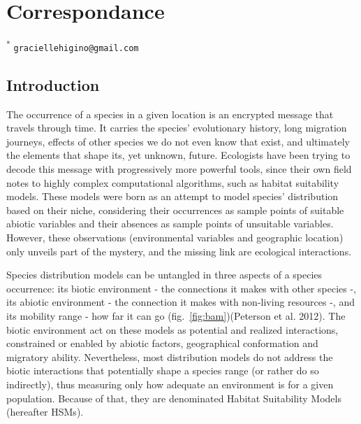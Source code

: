 \documentclass[12pt]{article}
\begin{document}
\section{Correspondance}

\textsuperscript{*}\,\,\texttt{graciellehigino@gmail.com}

\clearpage
\linenumbers
\doublespacing

\hypertarget{introduction}{%
\subsection{Introduction}\label{introduction}}

The occurrence of a species in a given location is an encrypted message
that travels through time. It carries the species' evolutionary history,
long migration journeys, effects of other species we do not even know
that exist, and ultimately the elements that shape its, yet unknown,
future. Ecologists have been trying to decode this message with
progressively more powerful tools, since their own field notes to highly
complex computational algorithms, such as habitat suitability models.
These models were born as an attempt to model species' distribution
based on their niche, considering their occurrences as sample points of
suitable abiotic variables and their absences as sample points of
unsuitable variables. However, these observations (environmental
variables and geographic location) only unveils part of the mystery, and
the missing link are ecological interactions.

Species distribution models can be untangled in three aspects of a
species occurrence: its biotic environment - the connections it makes
with other species -, its abiotic environment - the connection it makes
with non-living resources -, and its mobility range - how far it can go
(fig.~\ref{fig:bam})(Peterson et al. 2012). The biotic environment act
on these models as potential and realized interactions, constrained or
enabled by abiotic factors, geographical conformation and migratory
ability. Nevertheless, most distribution models do not address the
biotic interactions that potentially shape a species range (or rather do
so indirectly), thus measuring only how adequate an environment is for a
given population. Because of that, they are denominated Habitat
Suitability Models (hereafter HSMs).
\end{document}
